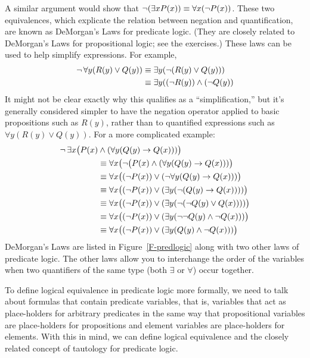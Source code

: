 A similar argument would show that $\lnot(\exists x P(x)) \equiv \forall x(\lnot P(x))$.
These two equivalences, which explicate the relation between negation and quantification,
are known as DeMorgan's Laws for predicate logic.  (They are closely related to
DeMorgan's Laws for propositional logic; see the exercises.)  These
laws can be used to help simplify expressions.  For example, 
\begin{align*}
  \lnot\,\forall y (R(y)\lor Q(y)) &\equiv \exists y(\lnot(R(y)\lor Q(y)))\\
       &\equiv \exists y((\lnot R(y))\land(\lnot Q(y))\\
\end{align*}
It might not be clear exactly why this qualifies as a ``simplification,''
but it's generally considered simpler to have the negation operator applied
to basic propositions such as $R(y)$, rather than to quantified expressions
such as \hbox{$\forall y (R(y)\lor Q(y))$}.
For a more complicated example:
\begin{align*}
  \lnot\,\exists x\big(P(x)&\land (\forall y (Q(y)\rightarrow Q(x)))\big)\\
            &\equiv\forall x\big(\lnot\big(P(x)\land (\forall y (Q(y)\rightarrow Q(x)))\big)\\
            &\equiv\forall x\big((\lnot P(x))\lor (\lnot \forall y (Q(y)\rightarrow Q(x)))\big)\\
            &\equiv\forall x\big((\lnot P(x))\lor (\exists y(\lnot (Q(y)\rightarrow Q(x))))\big)\\
            &\equiv\forall x\big((\lnot P(x))\lor (\exists y(\lnot (\lnot Q(y)\lor Q(x))))\big)\\
            &\equiv\forall x\big((\lnot P(x))\lor (\exists y(\lnot\lnot Q(y)\land \lnot Q(x)))\big)\\
            &\equiv\forall x\big((\lnot P(x))\lor (\exists y(Q(y)\land \lnot Q(x)))\big)\\
\end{align*}
DeMorgan's Laws are listed in Figure~\ref{F-predlogic} along with two
other laws of predicate logic.  The other laws allow you to interchange
the order of the variables when two quantifiers of the same type
(both $\exists$ or $\forall$) occur together. 

To define logical equivalence in predicate logic more formally,
we need to talk about formulas that contain predicate variables,
that is, variables that act as place-holders for arbitrary predicates
in the same way that propositional variables are place-holders for
propositions and element variables are place-holders for
elements.  With this in mind, we can define logical equivalence
and the closely related concept of tautology for predicate logic.

